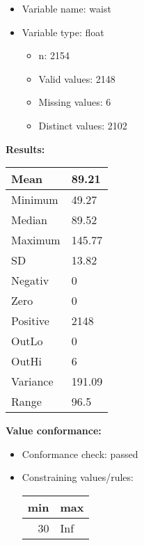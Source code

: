 \documentclass[
]{article}
\providecommand{\tightlist}{%
  \setlength{\itemsep}{0pt}\setlength{\parskip}{0pt}}
\begin{document}
\begin{itemize}
\tightlist
\item
  Variable name: waist
\item
  Variable type: float

  \begin{itemize}
  \tightlist
  \item
    n: 2154
  \item
    Valid values: 2148
  \item
    Missing values: 6
  \item
    Distinct values: 2102
  \end{itemize}
\end{itemize}

\textbf{Results:}\\

\begin{table}[H]
\centering
\begin{tabular}{l|l}
\hline
Mean & 89.21\\
\hline
Minimum & 49.27\\
\hline
Median & 89.52\\
\hline
Maximum & 145.77\\
\hline
SD & 13.82\\
\hline
Negativ & 0\\
\hline
Zero & 0\\
\hline
Positive & 2148\\
\hline
OutLo & 0\\
\hline
OutHi & 6\\
\hline
Variance & 191.09\\
\hline
Range & 96.5\\
\hline
\end{tabular}
\end{table}

\textbf{Value conformance:}

\begin{itemize}
\tightlist
\item
  Conformance check: passed
\item
  Constraining values/rules:

  \begin{table}[H]
  \centering
  \begin{tabular}{r|l}
  \hline
  \textbf{min} & \textbf{max}\\
  \hline
  30 & Inf\\
  \hline
  \end{tabular}
  \end{table}
\end{itemize}
\end{document}
